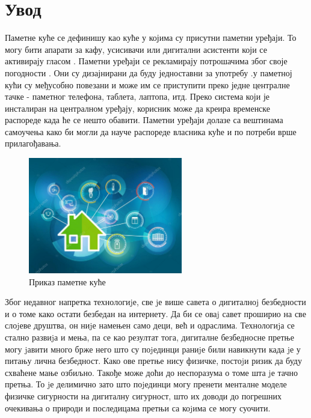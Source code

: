 \documentclass[a4paper]{article}
\begin{document}
\section{Увод}
Паметне куће се дефинишу као куће у којима су присутни паметни уређаји. То могу бити апарати за кафу, усисивачи или дигитални асистенти који се
активирају гласом \cite{1}. Паметни уређаји се рекламирају потрошачима због своје погодности \cite{2}. Они су дизајнирани да буду једноставни за
употребу \cite{3}. у паметној кући су међусобно повезани и може им се приступити преко једне централне тачке - паметног телефона, таблета, лаптопа, итд.
Преко система који је инсталиран на централном уређају, корисник може да креира временске распореде када ће се нешто обавити. Паметни уређаји
долазе са вештинама самоучења како би могли да науче распореде власника куће и по потреби врше прилагођавања.
\newline
\begin{figure}[h!]
    \centering
    \includegraphics[width=0.6\textwidth]{Slike/smart_home.jpg}
    \caption{\label{fig:smart}Приказ паметне куће}
\end{figure}
\newline
Због недавног напретка технологиjе, све jе више савета о дигиталноj безбедности и о томе како остати безбедан на интернету. Да би се оваj
савет проширио на све слоjеве друштва, он ниjе намењен само деци, већ и одраслима. Технологиjа се стално развиjа и мења, па се као
резултат тога, дигиталне безбедносне претње могу jавити много брже него што су поjединци раниjе били навикнути када jе у питању лична
безбедност. Како ове претње нису физичке, постоjи ризик да буду схваћене мање озбиљно. Такође може доћи до неспоразума о томе шта jе
тачно претња. То jе делимично зато што поjединци могу пренети менталне моделе физичке сигурности на дигиталну сигурност, што их доводи
до погрешних очекивања о природи и последицама претњи са коjима се могу суочити.
\newline\newline
\end{document}
